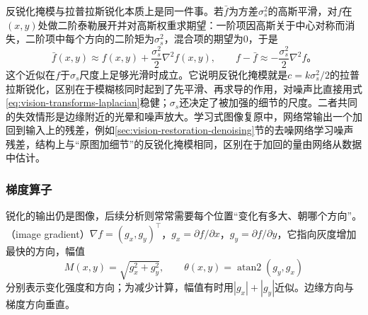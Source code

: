 反锐化掩模与拉普拉斯锐化本质上是同一件事。若$\bar f$为方差$\sigma_s^2$的高斯平滑，对$f$在$(x,y)$处做二阶泰勒展开并对高斯权重求期望：一阶项因高斯关于中心对称而消失，二阶项中每个方向的二阶矩为$\sigma_s^2$，混合项的期望为0，于是
\begin{equation}
  \bar f(x,y)\approx f(x,y)+\frac{\sigma_s^2}{2}\nabla^2f(x,y),\qquad
  f-\bar f\approx-\frac{\sigma_s^2}{2}\nabla^2f\text{。}
  \label{eq:vision-transforms-unsharp-laplacian}
\end{equation}
这个近似在$f$于$\sigma_s$尺度上足够光滑时成立。它说明反锐化掩模就是$c=k\sigma_s^2/2$的拉普拉斯锐化，区别在于模糊核同时起到了先平滑、再求导的作用，对噪声比直接用式\eqref{eq:vision-transforms-laplacian}稳健；$\sigma_s$还决定了被加强的细节的尺度。二者共同的失效情形是边缘附近的光晕和噪声放大。学习式图像复原中，网络常输出一个加回到输入上的残差，例如\ref{sec:vision-restoration-denoising}节的去噪网络学习噪声残差，结构上与“原图加细节”的反锐化掩模相同，区别在于加回的量由网络从数据中估计。

\subsubsection{梯度算子}

锐化的输出仍是图像，后续分析则常常需要每个位置“变化有多大、朝哪个方向”。（image gradient）$\nabla f=(g_x,g_y)^{\top}$，$g_x=\partial f/\partial x$，$g_y=\partial f/\partial y$，它指向灰度增加最快的方向，幅值
\begin{equation}
  M(x,y)=\sqrt{g_x^2+g_y^2},\qquad \theta(x,y)=\operatorname{atan2}(g_y,g_x)
  \label{eq:vision-transforms-gradient}
\end{equation}
分别表示变化强度和方向；为减少计算，幅值有时用$|g_x|+|g_y|$近似。边缘方向与梯度方向垂直。

